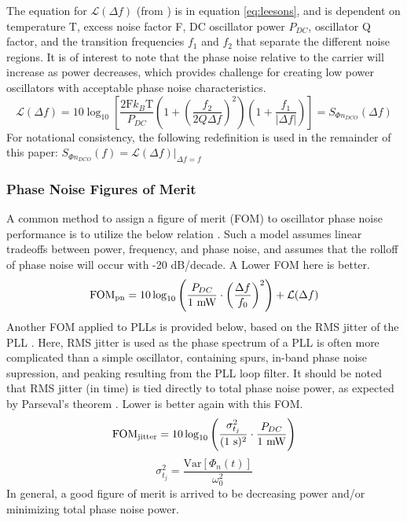 		The equation for $\mathcal{L}(\Delta f)$ (from \cite{lee_hajimiri_2000}) is in equation \ref{eq:leesons}, and is dependent on temperature T, excess noise factor F, DC oscillator power $P_{DC}$, oscillator Q factor, and the transition frequencies $f_1$ and $f_2$ that separate the different noise regions. It is of interest to note that the phase noise relative to the carrier will increase as power decreases, which provides challenge for creating low power oscillators with acceptable phase noise characteristics. 
		\begin{equation}\label{eq:leesons}
		\mathcal{L}(\Delta f) = 10\log_{10}\left[\frac{2\text{F}k_B\text{T}}{P_{DC}}\left(1+\left(\frac{f_2}{2Q\Delta f}\right)^2\right)\left(1+\frac{f_1}{|\Delta f|}\right)\right] = S_{\Phi n_{DCO}}(\Delta f)
		\end{equation}
		For notational consistency, the following redefinition is used in the remainder of this paper: $S_{\Phi n_{DCO}}(f) = \mathcal{L}(\Delta f)|_{\Delta f = f}$

	\subsubsection{Phase Noise Figures of Merit}
	A common method to assign a figure of merit (FOM) to oscillator phase noise performance is to utilize the below relation \cite{Kinget1999}. Such a model assumes linear tradeoffs between power, frequency, and phase noise, and assumes that the rolloff of phase noise will occur with -20 dB/decade. A Lower FOM here is better.
	\begin{equation}\label{eq:fom_pn}
		\textnormal{FOM}_{\textnormal{pn}} = 10\log_{10}\left(\frac{P_{DC}}{\textnormal{1 mW}}\cdot\left(\frac{\Delta f}{f_0}\right)^2\right) + \mathcal{L}(\Delta f)
	\end{equation}
	Another FOM applied to PLLs is provided below, based on the RMS jitter of the PLL \cite{XiangGao2009}. Here, RMS jitter is used as the phase spectrum of a PLL is often more complicated than a simple oscillator, containing spurs, in-band phase noise supression, and peaking resulting from the PLL loop filter. It should be noted that RMS jitter (in time) is tied directly to total phase noise power, as expected by Parseval's theorem \cite{parseval_1799}.  Lower is better again with this FOM. 
	\begin{equation}\label{eq:fom_jitter}
		\textnormal{FOM}_{\textnormal{jitter}} = 10\log_{10}\left(\frac{\sigma_{t_j}^2}{(\textnormal{1 s})^2}\cdot\frac{P_{DC}}{\textnormal{1 mW}}\right)
	\end{equation}
	\begin{equation}
		\sigma_{t_j}^2 = \frac{\mathrm{Var}[\Phi_{n}(t)]}{\omega_0^2}
	\end{equation}
	In general, a good figure of merit is arrived to be decreasing power and/or minimizing total phase noise power. 
	
